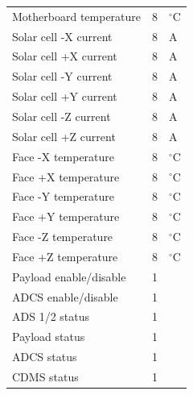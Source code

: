 \begin{apendicesenv}
\begin{table}[h]
{\begin{tabular}{@{}lll@{}}
Motherboard temperature                  & 8                        & $^{\circ}$C                \\
Solar cell -X current                    & 8                        & A                          \\
Solar cell +X current                    & 8                        & A                          \\
Solar cell -Y current                    & 8                        & A                          \\
Solar cell +Y current                    & 8                        & A                          \\
Solar cell -Z current                    & 8                        & A                          \\
Solar cell +Z current                    & 8                        & A                          \\
Face -X temperature                      & 8                        & $^{\circ}$C                \\
Face +X temperature                      & 8                        & $^{\circ}$C                \\
Face -Y temperature                      & 8                        & $^{\circ}$C                \\
Face +Y temperature                      & 8                        & $^{\circ}$C                \\
Face -Z temperature                      & 8                        & $^{\circ}$C                \\
Face +Z temperature                      & 8                        & $^{\circ}$C                \\
Payload enable/disable                   & 1                        &                            \\
ADCS enable/disable                      & 1                        &                            \\
ADS 1/2 status                           & 1                        &                            \\
Payload status                           & 1                        &                            \\
ADCS status                              & 1                        &                            \\
CDMS status                              & 1                        &                            \\

\end{tabular}}
\end{table}
\end{apendicesenv}
